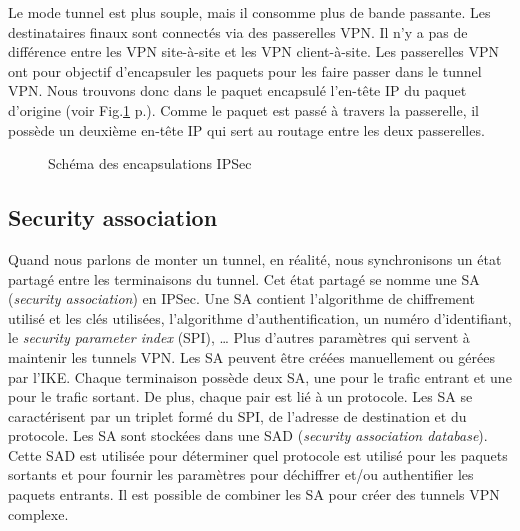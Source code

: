 Le mode tunnel est plus souple, mais il consomme plus de bande passante. 
Les destinataires finaux sont connectés via des passerelles VPN. 
Il n'y a pas de différence entre les VPN site-à-site et les VPN client-à-site. 
Les passerelles VPN ont pour objectif d'encapsuler les paquets pour les faire passer dans le tunnel VPN. 
Nous trouvons donc dans le paquet encapsulé l'en-tête IP du paquet d'origine (voir Fig.\ref{fig:encapIPS} p.\pageref{fig:encapIPS}). 
Comme le paquet est passé à travers la passerelle, il possède un deuxième en-tête IP qui sert au routage entre les deux passerelles.
\begin{figure}[ht]
\centering
{}
\caption{Schéma des encapsulations IPSec}
\label{fig:encapIPS}
\end{figure} 

\subsection{Security association}
Quand nous parlons de monter un tunnel, en réalité, nous synchronisons un état partagé entre les terminaisons du tunnel. 
Cet état partagé se nomme une SA (\textit{security association}) en IPSec. 
Une SA contient l'algorithme de chiffrement utilisé et les clés utilisées, l'algorithme d'authentification, un numéro d'identifiant, le \textit{security parameter index} (SPI), … 
Plus d'autres paramètres qui servent à maintenir les tunnels VPN. 
Les SA peuvent être créées manuellement ou gérées par l'IKE. 
Chaque terminaison possède deux SA, une pour le trafic entrant et une pour le trafic sortant. 
De plus, chaque pair est lié à un protocole. 
Les SA se caractérisent par un triplet formé du SPI, de l'adresse de destination et du protocole. 
Les SA sont stockées dans une SAD (\textit{security association database}). 
Cette SAD est utilisée pour déterminer quel protocole est utilisé pour les paquets sortants et pour fournir les paramètres pour déchiffrer et/ou authentifier les paquets entrants. 
Il est possible de combiner les SA pour créer des tunnels VPN complexe. 

